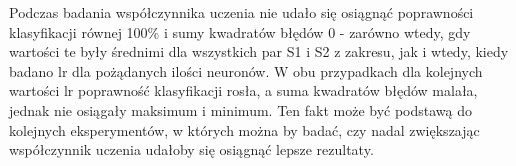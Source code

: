 \documentclass[a4paper, 12pt]{report}
\begin{document}
Podczas badania współczynnika uczenia nie udało się osiągnąć poprawności klasyfikacji równej 100\% i sumy kwadratów błędów 0 - zarówno wtedy, gdy wartości te były średnimi dla wszystkich par S1 i S2 z zakresu, jak i wtedy, kiedy badano lr dla pożądanych ilości neuronów. W obu przypadkach dla kolejnych wartości lr poprawność klasyfikacji rosła, a suma kwadratów błędów malała, jednak nie osiągały maksimum i minimum. Ten fakt może być podstawą do kolejnych eksperymentów, w których można by badać, czy nadal zwiększając współczynnik uczenia udałoby się osiągnąć lepsze rezultaty.


\end{document}
